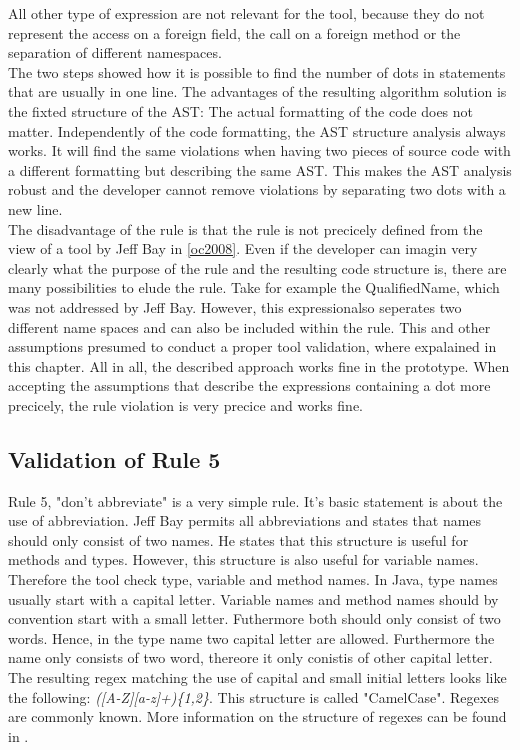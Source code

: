All other type of expression are not relevant for the tool, because they do not represent the access on a foreign field, the call on a foreign method or the separation of different namespaces.
\\

The two steps showed how it is possible to find the number of dots in statements that are usually in one line. The advantages of the resulting algorithm solution is the fixted structure of the \acf{AST}: The actual formatting of the code does not matter. Independently of the code formatting, the \acf{AST} structure analysis always works. It will find the same violations when having two pieces of source code with a different formatting but describing the same \acf{AST}. This makes the \acf{AST} analysis robust and the developer cannot remove violations by separating two dots with a new line.
\\

The disadvantage of the rule is that the rule is not precicely defined from the view of a tool by Jeff Bay in \ref{oc2008}. Even if the developer can imagin very clearly what the purpose of the rule and the resulting code structure is, there are many possibilities to elude the rule. Take for example the QualifiedName, which was not addressed by Jeff Bay. However, this expressionalso seperates two different name spaces and can also be included within the rule. This and other assumptions presumed to conduct a proper tool validation, where expalained in this chapter. All in all, the described approach works fine in the prototype. When accepting the assumptions that describe the expressions containing a dot more precicely, the rule violation is very precice and works fine.
\\

\subsection*{Validation of Rule 5}
Rule 5, "don't abbreviate" is a very simple rule. It's basic statement is about the use of abbreviation.
Jeff Bay permits all abbreviations and states that names should only consist of two names. He states that this structure is useful for methods and types. However, this structure is also useful for variable names.
\\
Therefore the tool check type, variable and method names. In Java, type names usually start with a capital letter. Variable names and method names should by convention start with a small letter. Futhermore both should only consist of two words. 
Hence, in the type name two capital letter are allowed. Furthermore the name only consists of two word, thereore it only conistis of other capital letter. The resulting regex matching the use of capital and small initial letters looks like the following: \textit{([A-Z][a-z]+)\{1,2\}}. This structure is called "CamelCase". Regexes are commonly known. More information on the structure of regexes can be found in \cite[Regex]{wiki}.
\\

